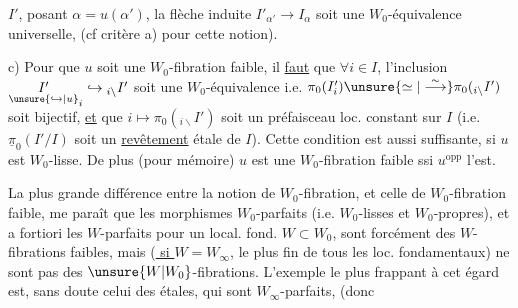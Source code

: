 
$I'$, posant $\alpha=u(\alpha')$, la flèche induite $I'_{\alpha'}\longrightarrow I_\alpha$ soit une $W_0$-équivalence universelle,  (cf critère a) pour cette notion).

c) Pour que $u$ soit une $W_0$-fibration faible, il \uline{faut} que $\forall i\in I$, l'inclusion $\underset{\unsure{\hookrightarrow|u}}{I'}_i\hookrightarrow{}_{i\backslash}I'$ soit une $W_0$-équivalence i.e. $\pi_0(I'_i)\unsure{\simeq|\stackrel{\sim}{\longrightarrow}}\pi_0({}_{i\backslash}I')$ soit bijectif, \uline{et} que $i\longmapsto\pi_0({}_{i\backslash}I')$ soit un préfaisceau loc. constant sur $I$ (i.e. $\underline{\pi}_0(I'/I)$ soit un \uline{revêtement} étale de $I$). Cette condition est aussi suffisante, si $u$ est $W_0$-lisse.  De plus (pour mémoire) $u$ est une $W_0$-fibration faible ssi $u^{\mathrm{opp}}$ l'est.

La plus grande différence entre la notion de $W_0$-fibration, et celle de $W_0$-fibration faible, me paraît que les morphismes $W_0$-parfaits (i.e. $W_0$-lisses et $W_0$-propres), et a fortiori les $W$-parfaits  pour un local. fond. $W\subset W_0$, sont forcément des $W$-fibrations faibles, mais (\uline{ si $W=W_\infty$}, le plus fin de tous les loc. fondamentaux)  ne sont pas des $\unsure{W|W_0}$-fibrations. L'exemple le plus frappant à cet égard est, sans doute celui des  étales, qui sont $W_\infty$-parfaits, (donc
